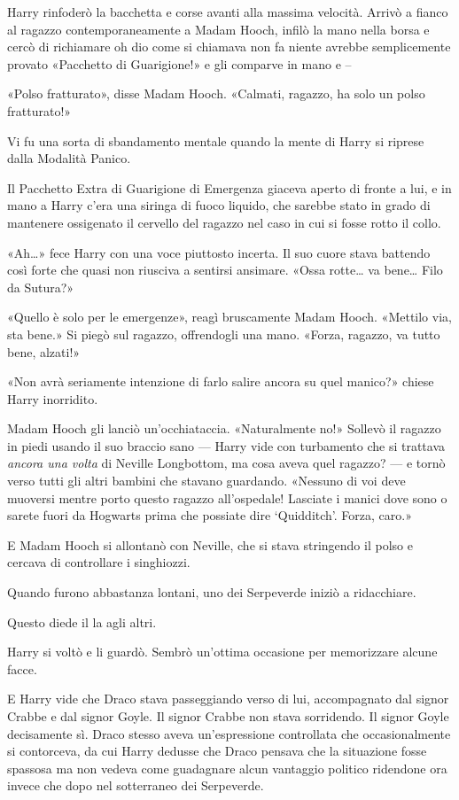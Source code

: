 Harry rinfoderò la bacchetta e corse avanti alla massima velocità. Arrivò a fianco al ragazzo contemporaneamente a Madam Hooch, infilò la mano nella borsa e cercò di richiamare oh dio come si chiamava non fa niente avrebbe semplicemente provato «Pacchetto di Guarigione!» e gli comparve in mano e –

«Polso fratturato», disse Madam Hooch. «Calmati, ragazzo, ha solo un polso fratturato!»

Vi fu una sorta di sbandamento mentale quando la mente di Harry si riprese dalla Modalità Panico.

Il Pacchetto Extra di Guarigione di Emergenza giaceva aperto di fronte a lui, e in mano a Harry c’era una siringa di fuoco liquido, che sarebbe stato in grado di mantenere ossigenato il cervello del ragazzo nel caso in cui si fosse rotto il collo.

«Ah…» fece Harry con una voce piuttosto incerta. Il suo cuore stava battendo così forte che quasi non riusciva a sentirsi ansimare. «Ossa rotte… va bene… Filo da Sutura?»

«Quello è solo per le emergenze», reagì bruscamente Madam Hooch. «Mettilo via, sta bene.» Si piegò sul ragazzo, offrendogli una mano. «Forza, ragazzo, va tutto bene, alzati!»

«Non avrà seriamente intenzione di farlo salire ancora su quel manico?» chiese Harry inorridito.

Madam Hooch gli lanciò un’occhiataccia. «Naturalmente no!» Sollevò il ragazzo in piedi usando il suo braccio sano — Harry vide con turbamento che si trattava \textit{ancora una volta} di Neville Longbottom, ma cosa aveva quel ragazzo? — e tornò verso tutti gli altri bambini che stavano guardando. «Nessuno di voi deve muoversi mentre porto questo ragazzo all’ospedale! Lasciate i manici dove sono o sarete fuori da Hogwarts prima che possiate dire ‘Quidditch’. Forza, caro.»

E Madam Hooch si allontanò con Neville, che si stava stringendo il polso e cercava di controllare i singhiozzi.

Quando furono abbastanza lontani, uno dei Serpeverde iniziò a ridacchiare.

Questo diede il la agli altri.

Harry si voltò e li guardò. Sembrò un’ottima occasione per memorizzare alcune facce.

E Harry vide che Draco stava passeggiando verso di lui, accompagnato dal signor Crabbe e dal signor Goyle. Il signor Crabbe non stava sorridendo. Il signor Goyle decisamente sì. Draco stesso aveva un’espressione controllata che occasionalmente si contorceva, da cui Harry dedusse che Draco pensava che la situazione fosse spassosa ma non vedeva come guadagnare alcun vantaggio politico ridendone ora invece che dopo nel sotterraneo dei Serpeverde.

